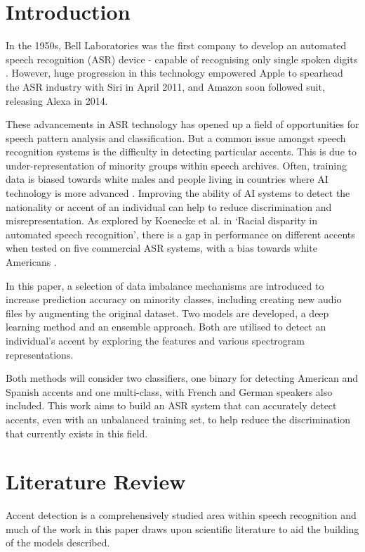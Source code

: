 \documentclass[conference]{IEEEtran}
\begin{document}
\section{Introduction}
\label{sec:Intro}

In the 1950s, Bell Laboratories was the first company to develop an automated speech recognition (ASR) device - capable of recognising only single spoken digits \cite{pierce1969whither}. However, huge progression in this technology empowered Apple to spearhead the ASR industry with Siri in April 2011, and Amazon soon followed suit, releasing Alexa in 2014.

These advancements in ASR technology has opened up a field of opportunities for speech pattern analysis and classification. But a common issue amongst speech recognition systems is the difficulty in detecting particular accents. This is due to under-representation of minority groups within speech archives. Often, training data is biased towards white males and people living in countries where AI technology is more advanced \cite{racistAI}. Improving the ability of AI systems to detect the nationality or accent of an individual can help to reduce discrimination and misrepresentation. As explored by Koenecke et al. in ‘Racial disparity in automated speech recognition’, there is a gap in performance on different accents when tested on five commercial ASR systems, with a bias towards white Americans \cite{SPEECH}.

In this paper, a selection of data imbalance mechanisms are introduced to increase prediction accuracy on minority classes, including creating new audio files by augmenting the original dataset. Two models are developed, a deep learning method and an ensemble approach. Both are utilised to detect an individual's accent by exploring the features and various spectrogram representations. 

Both methods will consider two classifiers, one binary for detecting American and Spanish accents and one multi-class, with French and German speakers also included. This work aims to build an ASR system that can accurately detect accents, even with an unbalanced training set, to help reduce the discrimination that currently exists in this field. 

\section{Literature Review}
\label{sec:Lit}
Accent detection is a comprehensively studied area within speech recognition and much of the work in this paper draws upon scientific literature to aid the building of the models described.
\end{document}
